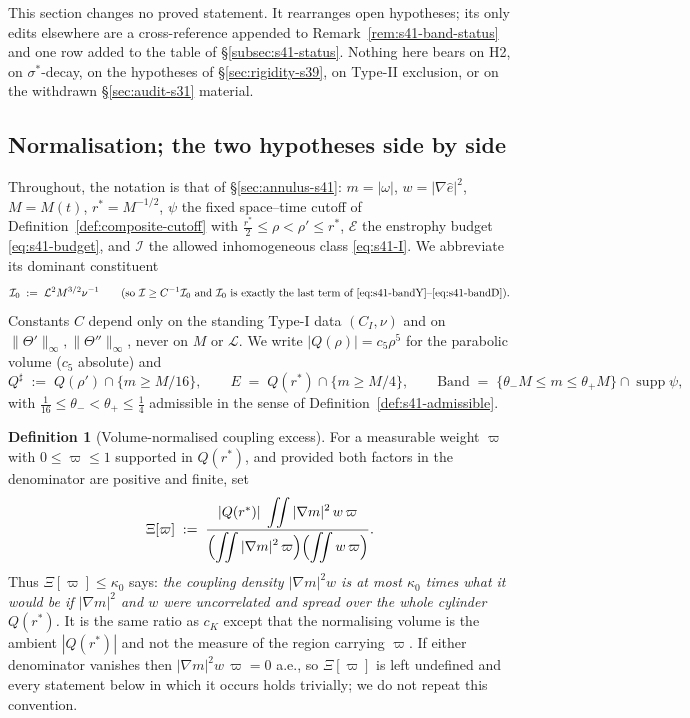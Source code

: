 \documentclass[11pt]{article}
\theoremstyle{definition}
\newtheorem{definition}[theorem]{Definition}
\theoremstyle{remark}
\begin{document}
\noindent This section changes no proved statement. It rearranges open
hypotheses; its only edits elsewhere are a cross-reference appended to
Remark~\ref{rem:s41-band-status} and one row added to the table of
\S\ref{subsec:s41-status}. Nothing here bears on H2, on $\sigma^*$-decay, on
the hypotheses of \S\ref{sec:rigidity-s39}, on Type-II exclusion, or on the
withdrawn \S\ref{sec:audit-s31} material.

\subsection{Normalisation; the two hypotheses side by side}
\label{subsec:s44-setup}

Throughout, the notation is that of \S\ref{sec:annulus-s41}: $m=|\omega|$,
$w=|\nabla\hat{e}|^2$, $M=M(t)$, $r^*=M^{-1/2}$, $\psi$ the fixed space--time
cutoff of Definition~\ref{def:composite-cutoff} with
$\tfrac{r^*}{2}\leq\rho<\rho'\leq r^*$, $\mathcal{E}$ the enstrophy budget
\eqref{eq:s41-budget}, and $\mathcal{I}$ the allowed inhomogeneous class
\eqref{eq:s41-I}. We abbreviate its dominant constituent
\[
  \mathcal{I}_0 \;:=\; \mathcal{L}^2M^{3/2}\nu^{-1}
  \qquad(\text{so }\mathcal{I}\geq C^{-1}\mathcal{I}_0
  \text{ and }\mathcal{I}_0\text{ is exactly the last term of }
  \eqref{eq:s41-bandY}\text{--}\eqref{eq:s41-bandD}).
\]
Constants $C$ depend only on the standing Type-I data $(C_I,\nu)$ and on
$\|\Theta'\|_\infty,\|\Theta''\|_\infty$, never on $M$ or $\mathcal{L}$.
We write $|Q(\rho)|=c_5\rho^5$ for the parabolic volume ($c_5$ absolute) and
\[
  Q^\sharp \;:=\; Q(\rho')\cap\{m\geq M/16\},
  \qquad
  E \;=\; Q(r^*)\cap\{m\geq M/4\},
  \qquad
  \mathrm{Band} \;=\; \{\theta_-M\leq m\leq\theta_+M\}\cap\operatorname{supp}\psi ,
\]
with $\tfrac1{16}\leq\theta_-<\theta_+\leq\tfrac14$ admissible in the sense of
Definition~\ref{def:s41-admissible}.

\begin{definition}[Volume-normalised coupling excess]\label{def:s44-excess}
  For a measurable weight $\varpi$ with $0\leq\varpi\leq1$ supported in
  $Q(r^*)$, and provided both factors in the denominator are positive and
  finite, set
  \[
    \Xi[\varpi]
    \;:=\;
    \frac{|Q(r^*)|\;\displaystyle\iint|\nabla m|^2\,w\,\varpi}
         {\Bigl(\displaystyle\iint|\nabla m|^2\,\varpi\Bigr)
          \Bigl(\displaystyle\iint w\,\varpi\Bigr)} .
  \]
  Thus $\Xi[\varpi]\leq\kappa_0$ says: \emph{the coupling density
  $|\nabla m|^2w$ is at most $\kappa_0$ times what it would be if
  $|\nabla m|^2$ and $w$ were uncorrelated and spread over the whole cylinder
  $Q(r^*)$.} It is the same ratio as $c_K$ except that the normalising volume
  is the ambient $|Q(r^*)|$ and not the measure of the region carrying
  $\varpi$. If either denominator vanishes then $|\nabla m|^2w\,\varpi=0$
  a.e., so $\Xi[\varpi]$ is left undefined and every statement below in which
  it occurs holds trivially; we do not repeat this convention.
\end{definition}
\end{document}
